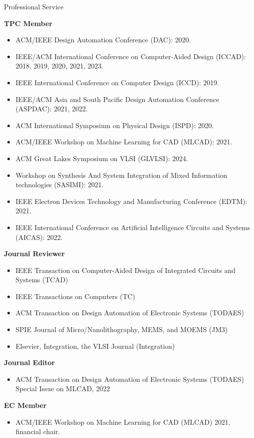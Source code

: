 
\begin{rSection}{Professional Service}

\textbf{TPC Member}
\begin{itemize}
    \item ACM/IEEE Design Automation Conference (DAC): 2020.
    \item IEEE/ACM International Conference on Computer-Aided Design (ICCAD): 2018, 2019, 2020, 2021, 2023.
    \item IEEE International Conference on Computer Design (ICCD): 2019.
    \item IEEE/ACM Asia and South Pacific Design Automation Conference (ASPDAC): 2021, 2022.
    \item ACM International Symposium on Physical Design (ISPD): 2020.
    \item ACM/IEEE Workshop on Machine Learning for CAD (MLCAD): 2021.
    \item ACM Great Lakes Symposium on VLSI (GLVLSI): 2024.
    \item Workshop on Synthesis And System Integration of Mixed Information technologies (SASIMI): 2021.
    \item IEEE Electron Devices Technology and Manufacturing Conference (EDTM): 2021.
    \item IEEE International Conference on Artificial Intelligence Circuits and Systems (AICAS): 2022. 
\end{itemize}

\textbf{Journal Reviewer}
\begin{itemize}
    \item IEEE Transaction on Computer-Aided Design of Integrated Circuits and Systems (TCAD)
    \item IEEE Transactions on Computers (TC)
    \item ACM Transaction on Design Automation of Electronic Systems (TODAES)
    \item SPIE Journal of Micro/Nanolithography, MEMS, and MOEMS (JM3)
    \item Elsevier, Integration, the VLSI Journal (Integration)
\end{itemize}

\textbf{Journal Editor}
\begin{itemize}
    \item ACM Transaction on Design Automation of Electronic Systems (TODAES) Special Issue on MLCAD, 2022
\end{itemize}

\textbf{EC Member}
\begin{itemize}
    \item ACM/IEEE Workshop on Machine Learning for CAD (MLCAD) 2021, financial chair.
\end{itemize}

\end{rSection}
